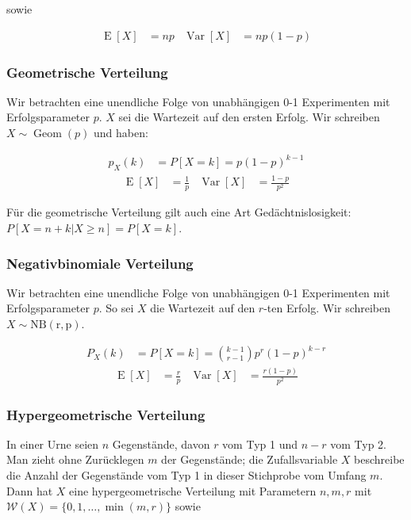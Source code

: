 \documentclass[25pt]{sciposter}
\newcommand{\W}{\mathcal{W}}
\newcommand{\Var}{\operatorname{Var}}
\newcommand{\E}{\operatorname{E}}
\begin{document}
\begin{multicols}{3}
		sowie 
		
		\begin{align*}
			\E[X] &= np & \Var[X] &= np(1-p)
		\end{align*}
		
		
		\subsubsection*{Geometrische Verteilung}
		Wir betrachten eine unendliche Folge von unabhängigen 0-1 Experimenten mit Erfolgsparameter $p$. $X$ sei die Wartezeit auf den ersten Erfolg. Wir schreiben $X\sim\operatorname{Geom}(p)$ und haben:
		
		\begin{align*}
			p_X(k) &= P[X=k] = p(1-p)^{k-1}
		\end{align*}
		\begin{align*}
			\E[X] &= \frac{1}{p} & \Var[X] &= \frac{1-p}{p^2}
		\end{align*}
		
		Für die geometrische Verteilung gilt auch eine Art Gedächtnislosigkeit: $P[X = n+k | X \geq n ] = P[X = k]$.
		
		\subsubsection*{Negativbinomiale Verteilung}
		Wir betrachten eine unendliche Folge von unabhängigen 0-1 Experimenten mit Erfolgsparameter $p$. So sei $X$ die Wartezeit auf den $r$-ten Erfolg. Wir schreiben $X\sim \operatorname{NB(r,p)}$.
		
		\begin{align*}
			P_X(k) &= P[X = k] = {k-1 \choose r-1} p^r(1-p)^{k-r}
		\end{align*}
		\begin{align*}
			\E[X] &= \frac{r}{p} & \Var[X] &= \frac{r(1-p)}{p^2}
		\end{align*}
		
		\subsubsection*{Hypergeometrische Verteilung}
		In einer Urne seien $n$ Gegenstände, davon $r$ vom Typ 1 und $n-r$ vom Typ 2. Man
		zieht ohne Zurücklegen $m$ der Gegenstände; die Zufallsvariable $X$ beschreibe die Anzahl
		der Gegenstände vom Typ 1 in dieser Stichprobe vom Umfang $m$. Dann hat $X$ eine
		hypergeometrische Verteilung mit Parametern $n,m,r$ mit $\W(X) = \{0, 1, \ldots, \min(m, r)\}$ sowie
		

\end{multicols}
\end{document}
